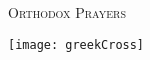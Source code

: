 




\begin{titlepage}
   \centering
   \LARGE{\textsc{Orthodox Prayers}}\par\vspace{1cm}
   \texttt{[image: greekCross]}
\end{titlepage}



\newpage



